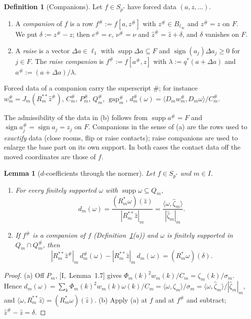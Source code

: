 \documentclass[10pt]{amsart}
\newtheorem{lemma}[theorem]{Lemma}
\theoremstyle{definition}
\newtheorem{definition}[theorem]{Definition}
\theoremstyle{remark}
\newcommand{\supp}{\operatorname{supp}}
\newcommand{\sgn}{\operatorname{sign}}
\newcommand{\gap}{\operatorname{gap}}
\newcommand{\zh}{\hat z}
\newcommand{\ip}[2]{\langle #1,#2\rangle}
\begin{document}
\begin{definition}[Companions]\label{def:II-companion}
Let $f\in S_{p^*}$ have forced data $(a,z,\dots)$.
\begin{enumerate}
\item[(a)] A \emph{companion} of $f$ is a row $f^\#:=f[a,z^\#]$ with
$z^\#\in B_{\ell_\infty}$ and $z^\#=z$ on $F$.  We put
$\delta:=z^\#-z$; then $e^\#=e$, $\nu^\#=\nu$ and $\zh^\#=\zh+\delta$, and
$\delta$ vanishes on $F$.
\item[(b)] A \emph{raise} is a vector $\Delta a\in\ell_1$ with
$\supp\Delta a\subseteq F$ and $\sgn(a_j)\Delta a_j\ge0$ for $j\in F$.  The
\emph{raise companion} is $f^\#:=f[a^\#,z]$ with $\lambda:=q^*(a+\Delta a)$
and $a^\#:=(a+\Delta a)/\lambda$.
\end{enumerate}
Forced data of a companion carry the superscript $\#$; for instance
$w^\#_m=J_m(R_m^{**}\zh^\#)$, $C^\#_m$, $P^\#_m$, $Q^\#_m$, $\gap^\#_m$,
$d^\#_m(\omega)=\ip{D_mw^\#_m}{D_m\omega}/C^\#_m$.
\end{definition}

The admissibility of the data in (b) follows from $\supp a^\#=F$ and
$\sgn a^\#_j=\sgn a_j=z_j$ on $F$.  Companions in the sense of (a) are the
rows used to \emph{exactify} data (close rooms, flip or raise contacts);
raise companions are used to enlarge the base part on its own support.
In both cases the contact data off the moved coordinates are those of $f$.

\begin{lemma}[$d$-coefficients through the normer]\label{lem:II-dnormer}
Let $f\in S_{p^*}$ and $m\in I$.
\begin{enumerate}
\item[(a)] For every finitely supported $\omega$ with $\supp\omega\subseteq
Q_m$,
\[
 d_m(\omega)=\frac{(R_m^*\omega)(\zh)}{|R_m^{**}\zh|_m}
 =\frac{\ip{\omega}{\hat\zeta_m}}{|\hat\zeta_m|_m}.
\]
\item[(b)] If $f^\#$ is a companion of $f$ \textup{(}Definition~\textup{\ref{def:II-companion}(a))} and $\omega$ is finitely supported
in $Q_m\cap Q^\#_m$, then
\[
 |R_m^{**}\zh^\#|_m\,d^\#_m(\omega)-|R_m^{**}\zh|_m\,d_m(\omega)
 =(R_m^*\omega)(\delta).
\]
\end{enumerate}
\end{lemma}

\begin{proof}
(a) Off $P_m$, [I,~Lemma~1.7] gives $\Phi_m(k)^2w_m(k)/C_m=
\zeta_m(k)/\sigma_m$.  Hence
$d_m(\omega)=\sum_k\Phi_m(k)^2w_m(k)\omega(k)/C_m=\ip{\omega}{\zeta_m}/\sigma_m
=\ip{\omega}{\hat\zeta_m}/|\hat\zeta_m|_m$, and
$\ip{\omega}{R_m^{**}\zh}=(R_m^*\omega)(\zh)$.
(b) Apply (a) at $f$ and at $f^\#$ and subtract; $\zh^\#-\zh=\delta$.
\end{proof}
\end{document}
